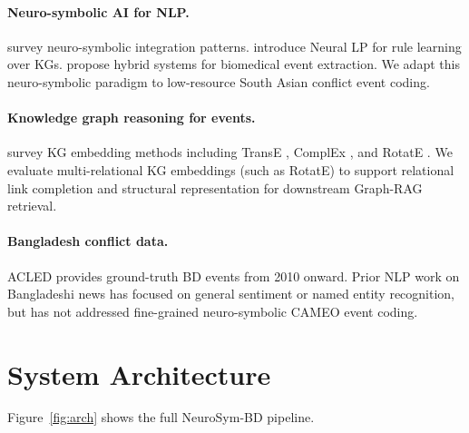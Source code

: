 \documentclass[11pt,a4paper]{article}
\begin{document}
\paragraph{Neuro-symbolic AI for NLP.}
\citet{garcez2023} survey neuro-symbolic integration patterns.
\citet{yang2017} introduce Neural LP for rule learning over KGs.
\citet{zhang2022} propose hybrid systems for biomedical event extraction.
We adapt this neuro-symbolic paradigm to low-resource South Asian conflict event coding.

\paragraph{Knowledge graph reasoning for events.}
\citet{rossi2021} survey KG embedding methods including TransE
\citep{bordes2013}, ComplEx \citep{trouillon2016}, and RotatE
\citep{sun2019}.
We evaluate multi-relational KG embeddings (such as RotatE) to support relational
link completion and structural representation for downstream Graph-RAG retrieval.

\paragraph{Bangladesh conflict data.}
ACLED \citep{raleigh2010} provides ground-truth BD events from
2010 onward. Prior NLP work on Bangladeshi news has focused on general sentiment or named entity recognition, but has not addressed fine-grained neuro-symbolic CAMEO event coding.

\section{System Architecture}
\label{sec:system}

Figure~\ref{fig:arch} shows the full NeuroSym-BD pipeline.
\end{document}
